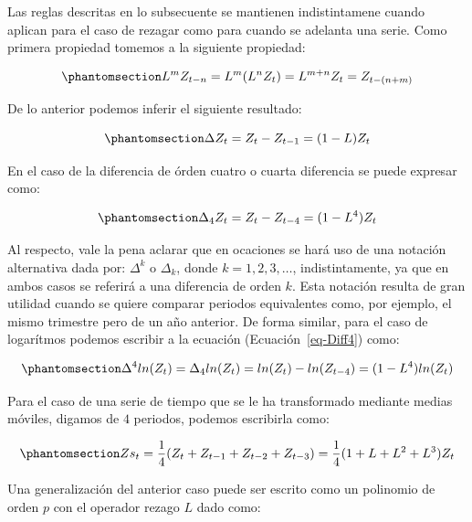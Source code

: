\documentclass[
  a4paper,
]{article}
\begin{document}
Las reglas descritas en lo subsecuente se mantienen indistintamene
cuando aplican para el caso de rezagar como para cuando se adelanta una
serie. Como primera propiedad tomemos a la siguiente propiedad:

\begin{equation}\phantomsection\label{eq-Lag4}{
    L^{m} Z_{t-n} = L^{m} (L^{n} Z_{t}) = L^{m + n} Z_{t} = Z_{t-(n + m)} 
}\end{equation}

De lo anterior podemos inferir el siguiente resultado:

\begin{equation}\phantomsection\label{eq-Lag5}{
    \Delta Z_{t} = Z_{t} - Z_{t-1} = (1 - L) Z_{t} 
}\end{equation}

En el caso de la diferencia de órden cuatro o cuarta diferencia se puede
expresar como:

\begin{equation}\phantomsection\label{eq-Diff4}{
    \Delta_{4} Z_{t} = Z_{t} - Z_{t-4} = (1 - L^4) Z_{t}
}\end{equation}

Al respecto, vale la pena aclarar que en ocaciones se hará uso de una
notación alternativa dada por: \(\Delta^k\) o \(\Delta_k\), donde
\(k = 1, 2, 3, \ldots\), indistintamente, ya que en ambos casos se
referirá a una diferencia de orden \(k\). Esta notación resulta de gran
utilidad cuando se quiere comparar periodos equivalentes como, por
ejemplo, el mismo trimestre pero de un año anterior. De forma similar,
para el caso de logarítmos podemos escribir a la ecuación
(Ecuación~\ref{eq-Diff4}) como:

\begin{equation}\phantomsection\label{eq-Diff5}{
    \Delta^{4} ln(Z_{t}) = \Delta_{4} ln(Z_{t}) = ln(Z_{t}) - ln(Z_{t-4}) = (1 - L^4) ln(Z_{t}) 
}\end{equation}

Para el caso de una serie de tiempo que se le ha transformado mediante
medias móviles, digamos de \(4\) periodos, podemos escribirla como:

\begin{equation}\phantomsection\label{eq-Diff6}{
Zs_{t} = \frac{1}{4}(Z_{t} + Z_{t-1} + Z_{t-2} + Z_{t-3}) = \frac{1}{4}(1 + L + L^2 + L^3)Z_{t}
}\end{equation}

Una generalización del anterior caso puede ser escrito como un polinomio
de orden \(p\) con el operador rezago \(L\) dado como:
\end{document}
